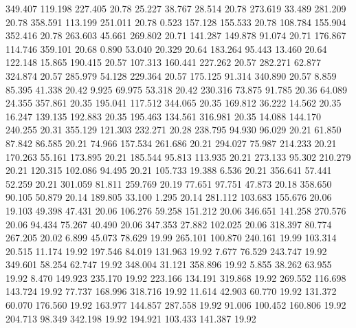  349.407  119.198  227.405        20.78
  25.227   38.767   28.514        20.78
 273.619   33.489  281.209        20.78
 358.591  113.199  251.011        20.78
   0.523  157.128  155.533        20.78
 108.784  155.904  352.416        20.78
 263.603   45.661  269.802        20.71
 141.287  149.878   91.074        20.71
 176.867  114.746  359.101        20.68
   0.890   53.040   20.329        20.64
 183.264   95.443   13.460        20.64
 122.148   15.865  190.415        20.57
 107.313  160.441  227.262        20.57
 282.271   62.877  324.874        20.57
 285.979   54.128  229.364        20.57
 175.125   91.314  340.890        20.57
   8.859   85.395   41.338        20.42
   9.925   69.975   53.318        20.42
 230.316   73.875   91.785        20.36
  64.089   24.355  357.861        20.35
 195.041  117.512  344.065        20.35
 169.812   36.222   14.562        20.35
  16.247  139.135  192.883        20.35
 195.463  134.561  316.981        20.35
  14.088  144.170  240.255        20.31
 355.129  121.303  232.271        20.28
 238.795   94.930   96.029        20.21
  61.850   87.842   86.585        20.21
  74.966  157.534  261.686        20.21
 294.027   75.987  214.233        20.21
 170.263   55.161  173.895        20.21
 185.544   95.813  113.935        20.21
 273.133   95.302  210.279        20.21
 120.315  102.086   94.495        20.21
 105.733   19.388    6.536        20.21
 356.641   57.441   52.259        20.21
 301.059   81.811  259.769        20.19
  77.651   97.751   47.873        20.18
 358.650   90.105   50.879        20.14
 189.805   33.100    1.295        20.14
 281.112  103.683  155.676        20.06
  19.103   49.398   47.431        20.06
 106.276   59.258  151.212        20.06
 346.651  141.258  270.576        20.06
  94.434   75.267   40.490        20.06
 347.353   27.882  102.025        20.06
 318.397   80.774  267.205        20.02
   6.899   45.073   78.629        19.99
 265.101  100.870  240.161        19.99
 103.314   20.515   11.174        19.92
 197.546   84.019  131.963        19.92
   7.677   76.529  243.747        19.92
 349.601   58.254   62.747        19.92
 348.004   31.121  358.896        19.92
   5.855   38.262   63.955        19.92
   8.470  149.923  235.170        19.92
 223.166  134.191  319.868        19.92
 269.552  116.698  143.724        19.92
  77.737  168.996  318.716        19.92
  11.614   42.903   60.770        19.92
 131.372   60.070  176.560        19.92
 163.977  144.857  287.558        19.92
  91.006  100.452  160.806        19.92
 204.713   98.349  342.198        19.92
 194.921  103.433  141.387        19.92
